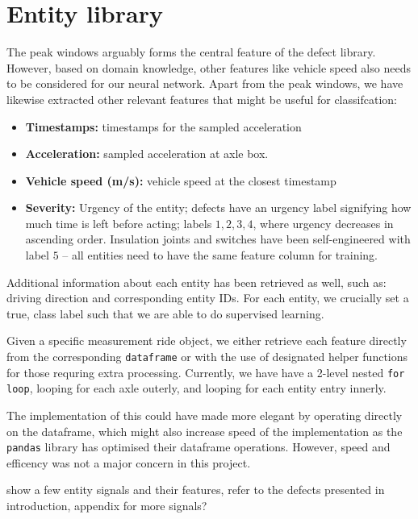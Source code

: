 \section{Entity library}
The peak windows arguably forms the central feature of the defect library. However, based on domain knowledge, other features like vehicle speed also needs to be considered for our neural network. Apart from the peak windows, we have likewise extracted other relevant features that might be useful for classifcation:
\begin{itemize}
	\item \textbf{Timestamps:} timestamps for the sampled acceleration
	\item \textbf{Acceleration:} sampled acceleration at axle box.
	\item \textbf{Vehicle speed (m/s):} vehicle speed at the closest timestamp
	\item \textbf{Severity:} Urgency of the entity; defects have an urgency label signifying how much time is left before acting; labels $1,2,3,4$, where urgency decreases in ascending order. Insulation joints and switches have been self-engineered with label $5$ -- all entities need to have the same feature column for training.
\end{itemize}
Additional information about each entity has been retrieved as well, such as: driving direction and corresponding entity IDs. For each entity, we crucially set a true, class label such that we are able to do supervised learning.

Given a specific measurement ride object, we either retrieve each feature directly from the corresponding \verb|dataframe| or with the use of designated helper functions for those requring extra processing. Currently, we have have a 2-level nested \verb|for loop|, looping for each axle outerly, and looping for each entity entry innerly.

The implementation of this could have made more elegant by operating directly on the dataframe, which might also increase speed of the implementation as the \verb|pandas| library has optimised their dataframe operations. However, speed and efficency was not a major concern in this project.

show a few entity signals and their features, refer to the defects presented in introduction,  appendix for more signals? \todo{}

